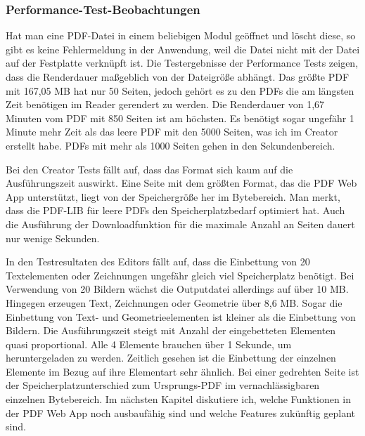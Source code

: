 \subsubsection{Performance-Test-Beobachtungen}
Hat man eine PDF-Datei in einem beliebigen Modul geöffnet und löscht diese, so gibt es keine Fehlermeldung in der Anwendung, weil die Datei nicht mit der Datei auf der Festplatte verknüpft ist. Die Testergebnisse der Performance Tests zeigen, dass die Renderdauer maßgeblich von der Dateigröße abhängt. Das größte PDF mit 167,05 MB hat nur 50 Seiten, jedoch gehört es zu den PDFs die am längsten Zeit benötigen im Reader gerendert zu werden. Die Renderdauer von 1,67 Minuten vom PDF mit 850 Seiten ist am höchsten. Es benötigt sogar ungefähr 1 Minute mehr Zeit als das leere PDF mit den 5000 Seiten, was ich im Creator erstellt habe. PDFs mit mehr als 1000 Seiten gehen in den Sekundenbereich.
\par 
Bei den Creator Tests fällt auf, dass das Format sich kaum auf die Ausführungszeit auswirkt. Eine Seite mit dem größten Format, das die PDF Web App unterstützt, liegt von der Speichergröße her im Bytebereich. Man merkt, dass die PDF-LIB für leere PDFs den Speicherplatzbedarf optimiert hat. Auch die Ausführung der Downloadfunktion für die maximale Anzahl an Seiten dauert nur wenige Sekunden. 
\par
In den Testresultaten des Editors fällt auf, dass die Einbettung von 20 Textelementen oder Zeichnungen ungefähr gleich viel Speicherplatz benötigt. Bei Verwendung von 20 Bildern wächst die Outputdatei allerdings auf über 10 MB. Hingegen erzeugen Text, Zeichnungen oder Geometrie über 8,6 MB. Sogar die Einbettung von Text- und Geometrieelementen ist kleiner als die Einbettung von Bildern. Die Ausführungszeit steigt mit Anzahl der eingebetteten Elementen quasi proportional. Alle 4 Elemente brauchen über 1 Sekunde, um heruntergeladen zu werden. Zeitlich gesehen ist die Einbettung der einzelnen Elemente im Bezug auf ihre Elementart sehr ähnlich. Bei einer gedrehten Seite ist der Speicherplatzunterschied zum Ursprungs-PDF im vernachlässigbaren einzelnen Bytebereich. Im nächsten Kapitel diskutiere ich, welche Funktionen in der PDF Web App noch ausbaufähig sind und welche Features zukünftig geplant sind.